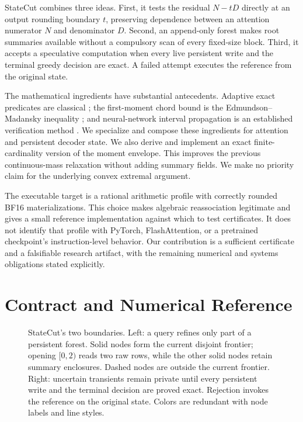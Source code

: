 \documentclass{article}
\theoremstyle{plain}
\theoremstyle{definition}
\theoremstyle{remark}
\begin{document}
StateCut combines three ideas. First, it tests the residual $N-tD$ directly at
an output rounding boundary $t$, preserving dependence between an attention
numerator $N$ and denominator $D$. Second, an append-only forest makes root
summaries available without a compulsory scan of every fixed-size block.
Third, it accepts a speculative computation when every live persistent write
and the terminal greedy decision are exact. A failed attempt executes the
reference from the original state.

The mathematical ingredients have substantial antecedents. Adaptive exact
predicates are classical \citep{shewchuk1997}; the first-moment chord bound is
the Edmundson--Madansky inequality \citep{edmundson1957,madansky1959}; and
neural-network interval propagation is an established verification method
\citep{singh2019deeppoly}. We specialize and compose these ingredients for
attention and persistent decoder state. We also derive and implement an exact
finite-cardinality version of the moment envelope. This improves the previous
continuous-mass relaxation without adding summary fields. We make no priority
claim for the underlying convex extremal argument.

The executable target is a rational arithmetic profile with correctly rounded
BF16 materializations. This choice makes algebraic reassociation legitimate
and gives a small reference implementation against which to test certificates.
It does not identify that profile with PyTorch, FlashAttention, or a pretrained
checkpoint's instruction-level behavior. Our contribution is a sufficient
certificate and a falsifiable research artifact, with the remaining numerical
and systems obligations stated explicitly.

\section{Contract and Numerical Reference}
\label{sec:contract}

\begin{figure}[t]
\centering
\begin{minipage}[t]{0.49\textwidth}\centering\vspace{0pt}

\end{minipage}\hfill
\begin{minipage}[t]{0.49\textwidth}\centering\vspace{0pt}

\end{minipage}
\caption{StateCut's two boundaries. Left: a query refines only part of a
persistent forest. Solid nodes form the current disjoint frontier; opening
$[0,2)$ reads two raw rows, while the other solid nodes retain summary
enclosures. Dashed nodes are outside the current frontier. Right: uncertain
transients remain private until every persistent write and the terminal
decision are proved exact. Rejection invokes the reference on the original
state. Colors are redundant with node labels and line styles.}
\label{fig:architecture}
\end{figure}
\end{document}
